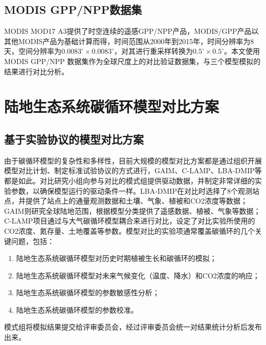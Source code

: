 \subsection{MODIS GPP/NPP数据集}
MODIS MOD17 A3提供了时空连续的遥感GPP/NPP产品，MODIS/GPP产品以其他MODIS产品为基础计算而得，时间范围从2000年到2015年，时间分辨率为8天，空间分辨率为$0.0083^{\circ} \times 0.0083^{\circ}$，对其进行重采样转换为$0.5^{\circ} \times 0.5^{\circ}$。本文使用MODIS GPP/NPP 数据集作为全球尺度上的对比验证数据集，与三个模型模拟的结果进行对比分析。


\section{陆地生态系统碳循环模型对比方案}
\label{sec:cmp-sln-analysis}
\subsection{基于实验协议的模型对比方案}
由于碳循环模型的复杂性和多样性，目前大规模的模型对比方案都是通过组织开展模型对比计划、制定标准试验协议的方式进行，GAIM、C-LAMP、LBA-DMIP等都是如此。对比研究小组向参与对比的模式组提供驱动数据，并制定非常详细的实验参数，以确保模型运行的驱动条件一样。LBA-DMIP在对比时选择了8个观测站点，并提供了站点上的通量观测数据和土壤、气象、植被和CO2浓度等数据；GAIM则研究全球陆地范围，根据模型分类提供了遥感数据、植被、气象等数据；C-LAMP项目通过与大气碳循环模型耦合来进行对比，设定了对比实验所使用的CO2浓度、氮存量、土地覆盖等参数。模型对比的实验项通常覆盖碳循环的几个关键问题，包括：

\begin{enumerate}[(1)]
\item 陆地生态系统碳循环模型对历史时期植被生长和碳循环的模拟；
\item 陆地生态系统碳循环模型对未来气候变化（温度、降水）和CO2浓度的响应；
\item 陆地生态系统碳循环模型的参数敏感性分析；
\item 陆地生态系统碳循环模型的参数校准。
\end{enumerate}

模式组将模拟结果提交给评审委员会，经过评审委员会统一对结果统计分析后发布出来。

